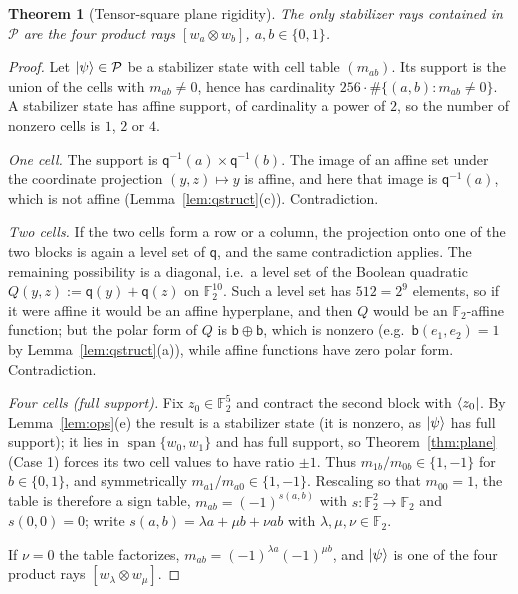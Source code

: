 \documentclass[11pt]{article}
\theoremstyle{plain}
\newtheorem{theorem}{Theorem}[section]
\theoremstyle{definition}
\newcommand{\F}{\mathbb{F}}
\newcommand{\qq}{\mathsf{q}}
\newcommand{\bb}{\mathsf{b}}
\newcommand{\spn}{\operatorname{span}}
\begin{document}
\begin{theorem}[Tensor-square plane rigidity]\label{thm:squareplane}
The only stabilizer rays contained in $\mathcal P$ are the four product rays
$[w_a\otimes w_b]$, $a,b\in\{0,1\}$.
\end{theorem}

\begin{proof}
Let $\ket\psi\in\mathcal P$ be a stabilizer state with cell table $(m_{ab})$. Its
support is the union of the cells with $m_{ab}\ne0$, hence has cardinality
$256\cdot\#\{(a,b):m_{ab}\ne0\}$. A stabilizer state has affine support, of cardinality
a power of $2$, so the number of nonzero cells is $1$, $2$ or $4$.

\emph{One cell.} The support is $\qq^{-1}(a)\times \qq^{-1}(b)$. The image of an affine
set under the coordinate projection $(y,z)\mapsto y$ is affine, and here that image is
$\qq^{-1}(a)$, which is not affine (Lemma~\ref{lem:qstruct}(c)). Contradiction.

\emph{Two cells.} If the two cells form a row or a column, the projection onto one of
the two blocks is again a level set of $\qq$, and the same contradiction applies. The
remaining possibility is a diagonal, i.e.\ a level set of the Boolean quadratic
$Q(y,z):=\qq(y)+\qq(z)$ on $\F_2^{10}$. Such a level set has $512=2^9$ elements, so if
it were affine it would be an affine hyperplane, and then $Q$ would be an $\F_2$-affine
function; but the polar form of $Q$ is $\bb\oplus\bb$, which is nonzero
(e.g.\ $\bb(e_1,e_2)=1$ by Lemma~\ref{lem:qstruct}(a)), while affine functions have zero
polar form. Contradiction.

\emph{Four cells (full support).} Fix $z_0\in\F_2^5$ and contract the second block with
$\bra{z_0}$. By Lemma~\ref{lem:ops}(e) the result is a stabilizer state (it is nonzero,
as $\ket\psi$ has full support); it lies in $\spn\{w_0,w_1\}$ and has full support, so
Theorem~\ref{thm:plane} (Case 1) forces its two cell values to have ratio $\pm1$. Thus
$m_{1b}/m_{0b}\in\{1,-1\}$ for $b\in\{0,1\}$, and symmetrically
$m_{a1}/m_{a0}\in\{1,-1\}$. Rescaling so that $m_{00}=1$, the table is therefore a sign
table, $m_{ab}=(-1)^{s(a,b)}$ with $s:\F_2^2\to\F_2$ and $s(0,0)=0$; write
$s(a,b)=\lambda a+\mu b+\nu ab$ with $\lambda,\mu,\nu\in\F_2$.

If $\nu=0$ the table factorizes, $m_{ab}=(-1)^{\lambda a}(-1)^{\mu b}$, and $\ket\psi$
is one of the four product rays $[w_\lambda\otimes w_\mu]$.


\end{proof}
\end{document}
